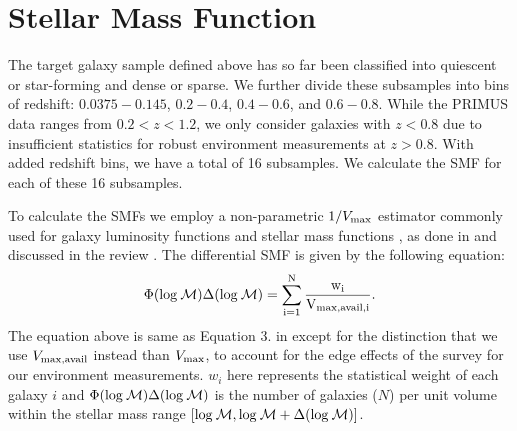 \documentclass{emulateapj}
\begin{document}

\section{Stellar Mass Function} \label{sec:smf}
The target galaxy sample defined above has so far
been classified into quiescent or star-forming and 
dense or sparse. We further divide these subsamples 
into bins of redshift: $0.0375-0.145$, 
$0.2-0.4$, $0.4-0.6$, and $0.6-0.8$. While the 
PRIMUS data ranges from $0.2 < z < 1.2$, we only 
consider galaxies with $ z<0.8$ due to insufficient
statistics for robust environment measurements at 
$z > 0.8$. With added redshift bins, we have a
total of 16 subsamples. We calculate the SMF for 
each of these 16 subsamples. 

To calculate the SMFs we employ a non-parametric 
$1/{V_{\rm{max}}}$ estimator commonly used for 
galaxy luminosity functions and stellar mass functions
, as done in \cite{Moustakas:2013aa} and discussed 
in the review \cite{Johnston:2011aa}. The differential 
SMF is given by the following equation:
\begin{equation} \label{eq:phi}
\Phi(\rm{log}\: \mathcal{M}) \Delta(\rm{log} \:\mathcal{M}) = \sum\limits_{i=1}^{N} \frac{w_i}{V_{\rm{max,avail},i}}. 
\end{equation}
The equation above is same as Equation 3. in 
\cite{Moustakas:2013aa} except for the distinction that 
we use $V_{\rm{max,avail}}$ instead than $V_{\rm{max}}$, 
to account for the edge effects of the survey for our
environment measurements. $w_i$ here represents 
the statistical weight of each galaxy $i$ and 
$\Phi(\rm{log}\: \mathcal{M}) \Delta(\rm{log}\: \mathcal{M})$ 
is the number of galaxies ($N$) per unit volume within the 
stellar mass range 
$[\rm{log} \:\mathcal{M}, \rm{log} \:\mathcal{M}+\Delta(\rm{log} \:\mathcal{M})]$.
\end{document}
